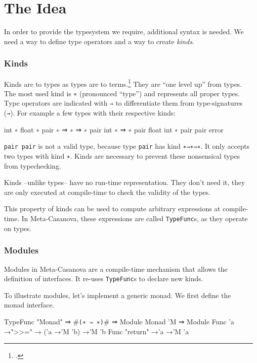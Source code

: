 \section{The Idea}
  In order to provide the typesystem we require, additional syntax is needed.
  We need a way to define type operators and a way to create \textit{kinds}.

  \subsubsection*{Kinds}
  Kinds are to types as types are to terms.\footcite[Chapter~30]{Pierce02}
  They are ``one level up'' from types.
  The most used kind is \texttt{∗} (pronounced ``type'') and represents all proper types.
  Type operators are indicated with \texttt{⇒} to differentiate them from type-signatures (\texttt{→}).
  For example a few types with their respective kinds:
  \begin{code}
  int             ∗
  float           ∗
  pair            ∗ ⇒ ∗ ⇒ ∗
  pair int        ∗ ⇒ ∗ 
  pair float int  ∗
  pair pair       error
  \end{code}

  \texttt{pair pair} is not a valid type, because type \texttt{pair} has kind \texttt{∗⇒∗⇒∗}.
  It only accepts two types with kind \texttt{∗}.
  Kinds are necessary to prevent these nonsensical types from typechecking.

  Kinds --unlike types-- have no run-time representation.
  They don't need it, they are only executed at compile-time to check the validity of the types.

  This property of kinds can be used to compute arbitrary expressions at compile-time.
  In Meta-Casanova, these expressions are called \texttt{TypeFunc}s, as they operate on types.

  \subsubsection*{Modules}
  Modules in Meta-Casanova are a compile-time mechanism that allows the definition of interfaces.
  It re-uses \texttt{TypeFunc}s to declare new kinds.

  To illustrate modules, let's implement a generic monad.
  We first define the monad interface.
  
  \begin{code}
  TypeFunc "Monad" ⇒ #\verb|(∗ ⇒ ∗)|# ⇒ Module
  Monad 'M ⇒ Module {
    Func 'a →">>=" → ('a →'M 'b) →'M 'b
    Func "return" →'a →'M 'a
  }
  \end{code}

